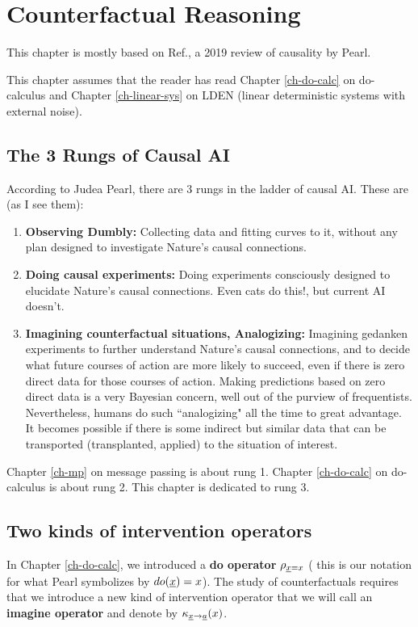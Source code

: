 \chapter{Counterfactual Reasoning}
\label{ch-counterf}
This chapter is mostly based on 
Ref.\cite{pearl-2019review}, a 2019
 review of causality by Pearl.

This chapter
assumes that the reader
has read
Chapter \ref{ch-do-calc}
on do-calculus and
Chapter \ref{ch-linear-sys}  
on LDEN (linear 
deterministic systems
with external noise).

\section*{The 3 Rungs of Causal AI}
According to 
Judea Pearl,
there are 3 rungs in the
ladder of causal AI.
These are (as I see them):
\begin{enumerate}
\item
{\bf Observing Dumbly:} Collecting 
data
and fitting curves to it,
without any plan 
designed to
investigate Nature's 
causal connections.
\item {\bf Doing causal
experiments:} 
Doing experiments 
consciously designed to
elucidate
Nature's causal connections.
Even cats do this!, but current AI doesn't.
\item {\bf Imagining
 counterfactual situations, Analogizing:}
Imagining gedanken experiments
to further understand
Nature's causal connections,
and to decide what future
courses of action are
more likely to succeed,
even if there is zero
direct data for 
those courses of action.
Making
predictions based
on zero direct data is a very Bayesian
concern, well out of the purview of 
frequentists. Nevertheless,
humans do such
``analogizing" 
all the time to great advantage.
It becomes
possible if there
is some indirect but similar
data that can be transported
(transplanted, applied)
to the situation of
interest.
\end{enumerate}
Chapter \ref{ch-mp}
on message passing
is about rung 1.
Chapter \ref{ch-do-calc}
on do-calculus is about rung 2.
This chapter is dedicated to rung 3.



\section*{Two kinds of
 intervention operators}
In Chapter \ref{ch-do-calc},
we introduced a {\bf do operator}
$\rho_{{\underline{x}}=x}$ (
this is our notation for what Pearl 
symbolizes by $do({\underline{x}})=x$).
The study of counterfactuals 
requires that we
introduce a new
kind of intervention
operator that we will
call an {\bf imagine operator}
and denote by $\kappa_{{\underline{x}}\rightarrow{\underline{a}}}(x)$.

